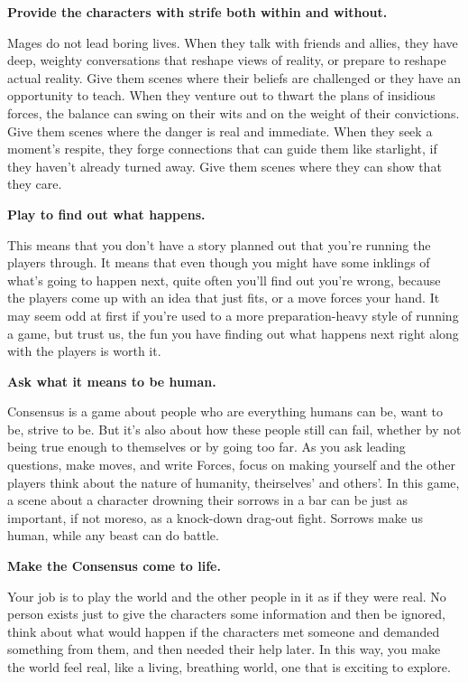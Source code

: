 \documentclass[
  oneside,
  statementpaper,
  9pt]{memoir}
\begin{document}
\textbf{Provide the characters with strife both within and without.}

Mages do not lead boring lives. When they talk with friends and allies,
they have deep, weighty conversations that reshape views of reality, or
prepare to reshape actual reality. Give them scenes where their beliefs
are challenged or they have an opportunity to teach. When they venture
out to thwart the plans of insidious forces, the balance can swing on
their wits and on the weight of their convictions. Give them scenes
where the danger is real and immediate. When they seek a moment's
respite, they forge connections that can guide them like starlight, if
they haven't already turned away. Give them scenes where they can show
that they care.

\textbf{Play to find out what happens.}

This means that you don't have a story planned out that you're running
the players through. It means that even though you might have some
inklings of what's going to happen next, quite often you'll find out
you're wrong, because the players come up with an idea that just fits,
or a move forces your hand. It may seem odd at first if you're used to a
more preparation-heavy style of running a game, but trust us, the fun
you have finding out what happens next right along with the players is
worth it.

\textbf{Ask what it means to be human.}

Consensus is a game about people who are everything humans can be, want
to be, strive to be. But it's also about how these people still can
fail, whether by not being true enough to themselves or by going too
far. As you ask leading questions, make moves, and write Forces, focus
on making yourself and the other players think about the nature of
humanity, theirselves' and others'. In this game, a scene about a
character drowning their sorrows in a bar can be just as important, if
not moreso, as a knock-down drag-out fight. Sorrows make us human, while
any beast can do battle.

\textbf{Make the Consensus come to life.}

Your job is to play the world and the other people in it as if they were
real. No person exists just to give the characters some information and
then be ignored, think about what would happen if the characters met
someone and demanded something from them, and then needed their help
later. In this way, you make the world feel real, like a living,
breathing world, one that is exciting to explore.
\end{document}
